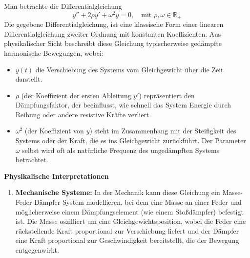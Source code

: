 {
Man betrachte die Differentialgleichung
\[
y'' + 2\rho y' + \omega^2 y = 0, \quad \text{mit } \rho, \omega \in \mathbb R_+
\]
Die gegebene Differentialgleichung, ist eine klassische Form einer linearen Differentialgleichung zweiter Ordnung mit konstanten Koeffizienten. Aus physikalischer Sicht beschreibt diese Gleichung typischerweise gedämpfte harmonische Bewegungen, wobei:
\begin{itemize}
  \item \( y(t) \) die Verschiebung des Systems vom Gleichgewicht über die Zeit darstellt.
  \item \( \rho \) (der Koeffizient der ersten Ableitung \( y' \)) repräsentiert den Dämpfungsfaktor, der beeinflusst, wie schnell das System Energie durch Reibung oder andere resistive Kräfte verliert.
  \item \( \omega^2 \) (der Koeffizient von \( y \)) steht im Zusammenhang mit der Steifigkeit des Systems oder der Kraft, die es ins Gleichgewicht zurückführt. Der Parameter \( \omega \) selbst wird oft als natürliche Frequenz des ungedämpften Systems betrachtet.
\end{itemize}

\textbf{Physikalische Interpretationen}
\begin{enumerate}
  \item \textbf{Mechanische Systeme:} In der Mechanik kann diese Gleichung ein Masse-Feder-Dämpfer-System modellieren, bei dem eine Masse an einer Feder und möglicherweise einem Dämpfungselement (wie einem Stoßdämpfer) befestigt ist. Die Masse oszilliert um eine Gleichgewichtsposition, wobei die Feder eine rückstellende Kraft proportional zur Verschiebung liefert und der Dämpfer eine Kraft proportional zur Geschwindigkeit bereitstellt, die der Bewegung entgegenwirkt.

\begin{center}
\end{center}
\end{enumerate}}
